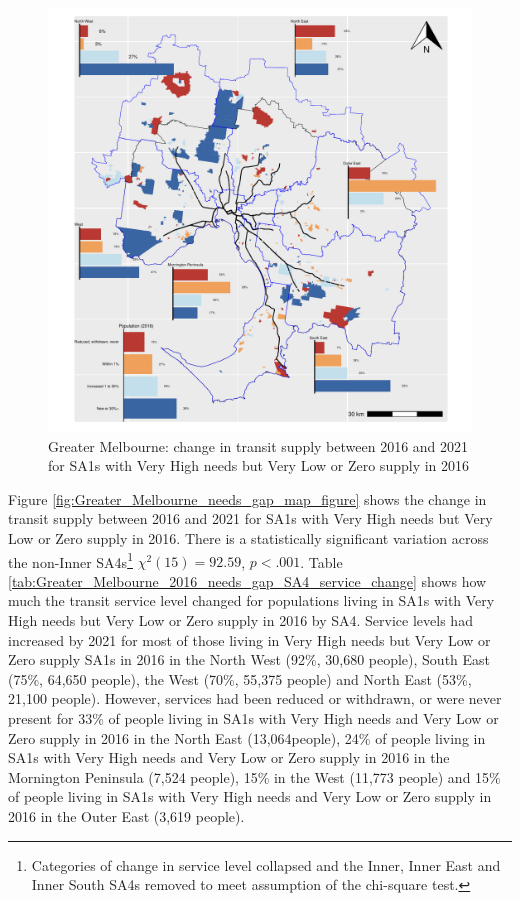 \documentclass[preprint, 3p,
authoryear]{elsarticle} %
\begin{document}
\begin{figure}
\centering
\includegraphics{ReynoldsCurrieQu2024_files/figure-latex/Greater_Melbourne_2016_needs_gap_SA4_service_change-1.pdf}
\caption{Greater Melbourne: change in transit supply between 2016 and
2021 for SA1s with Very High needs but Very Low or Zero supply in 2016}
\end{figure}

Figure \ref{fig:Greater_Melbourne_needs_gap_map_figure} shows the change
in transit supply between 2016 and 2021 for SA1s with Very High needs
but Very Low or Zero supply in 2016. There is a statistically
significant variation across the non-Inner SA4s\footnote{Categories of
  change in service level collapsed and the Inner, Inner East and Inner
  South SA4s removed to meet assumption of the chi-square test.}
\(\chi^2(15) = 92.59\), \(p < .001\). Table
\ref{tab:Greater_Melbourne_2016_needs_gap_SA4_service_change} shows how
much the transit service level changed for populations living in SA1s
with Very High needs but Very Low or Zero supply in 2016 by SA4. Service
levels had increased by 2021 for most of those living in Very High needs
but Very Low or Zero supply SA1s in 2016 in the North West (92\%, 30,680
people), South East (75\%, 64,650 people), the West (70\%, 55,375
people) and North East (53\%, 21,100 people). However, services had been
reduced or withdrawn, or were never present for 33\% of people living in
SA1s with Very High needs and Very Low or Zero supply in 2016 in the
North East (13,064people), 24\% of people living in SA1s with Very High
needs and Very Low or Zero supply in 2016 in the Mornington Peninsula
(7,524 people), 15\% in the West (11,773 people) and 15\% of people
living in SA1s with Very High needs and Very Low or Zero supply in 2016
in the Outer East (3,619 people).
\end{document}
